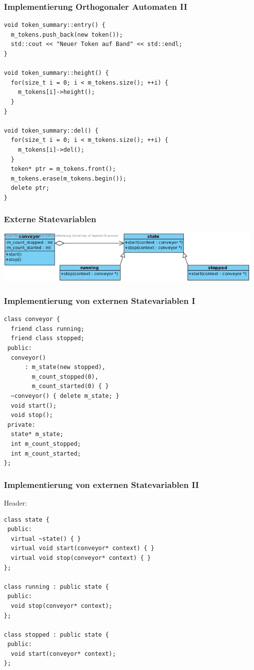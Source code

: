 \documentclass{beamer}
\begin{document}
\begin{frame}[fragile]
 \frametitle{Implementierung Orthogonaler Automaten II}
 \begin{lstlisting}
void token_summary::entry() {
  m_tokens.push_back(new token());
  std::cout << "Neuer Token auf Band" << std::endl;
}

void token_summary::height() {
  for(size_t i = 0; i < m_tokens.size(); ++i) {
    m_tokens[i]->height();
  }
}

void token_summary::del() {
  for(size_t i = 0; i < m_tokens.size(); ++i) {
    m_tokens[i]->del();
  }
  token* ptr = m_tokens.front();
  m_tokens.erase(m_tokens.begin());
  delete ptr;
}
 \end{lstlisting}
\end{frame}

\begin{frame}
 \frametitle{Externe Statevariablen}
 \includegraphics[scale=.44]{img/fsm_externe_state_var.jpg}
\end{frame}

\begin{frame}[fragile]
 \frametitle{Implementierung von externen Statevariablen I}
 \begin{lstlisting}
class conveyor {
  friend class running;
  friend class stopped;
 public:
  conveyor()
      : m_state(new stopped),
        m_count_stopped(0),
        m_count_started(0) { }
  ~conveyor() { delete m_state; }
  void start();
  void stop();
 private:
  state* m_state;
  int m_count_stopped;
  int m_count_started;
};
\end{lstlisting}
\end{frame}

\begin{frame}[fragile]
 \frametitle{Implementierung von externen Statevariablen II}
 Header:
 \begin{lstlisting}
class state {
 public:
  virtual ~state() { }
  virtual void start(conveyor* context) { }
  virtual void stop(conveyor* context) { }
};

class running : public state {
 public:
  void stop(conveyor* context);
};

class stopped : public state {
 public:
  void start(conveyor* context);
};
 \end{lstlisting}
\end{frame}
\end{document}
